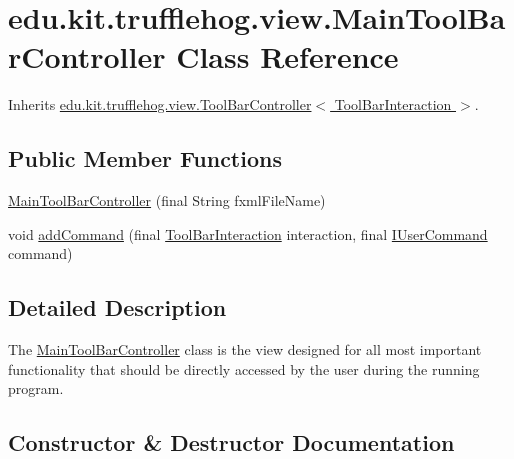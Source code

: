 \hypertarget{classedu_1_1kit_1_1trufflehog_1_1view_1_1_main_tool_bar_controller}{}\section{edu.\+kit.\+trufflehog.\+view.\+Main\+Tool\+Bar\+Controller Class Reference}
\label{classedu_1_1kit_1_1trufflehog_1_1view_1_1_main_tool_bar_controller}


Inherits \hyperlink{classedu_1_1kit_1_1trufflehog_1_1view_1_1_tool_bar_controller}{edu.\+kit.\+trufflehog.\+view.\+Tool\+Bar\+Controller$<$ Tool\+Bar\+Interaction $>$}.

\subsection*{Public Member Functions}
\begin{DoxyCompactItemize}
\item 
\hyperlink{classedu_1_1kit_1_1trufflehog_1_1view_1_1_main_tool_bar_controller_a0d502f7149126deaa2bf0e06d3733104}{Main\+Tool\+Bar\+Controller} (final String fxml\+File\+Name)
\item 
void \hyperlink{classedu_1_1kit_1_1trufflehog_1_1view_1_1_main_tool_bar_controller_a2a28c44b6fa31c0ca709aed5c9a83e0d}{add\+Command} (final \hyperlink{enumedu_1_1kit_1_1trufflehog_1_1interaction_1_1_tool_bar_interaction}{Tool\+Bar\+Interaction} interaction, final \hyperlink{interfaceedu_1_1kit_1_1trufflehog_1_1command_1_1usercommand_1_1_i_user_command}{I\+User\+Command} command)
\end{DoxyCompactItemize}


\subsection{Detailed Description}
The \hyperlink{classedu_1_1kit_1_1trufflehog_1_1view_1_1_main_tool_bar_controller}{Main\+Tool\+Bar\+Controller} class is the view designed for all most important functionality that should be directly accessed by the user during the running program. 

\subsection{Constructor \& Destructor Documentation}
\hypertarget{classedu_1_1kit_1_1trufflehog_1_1view_1_1_main_tool_bar_controller_a0d502f7149126deaa2bf0e06d3733104}{}
